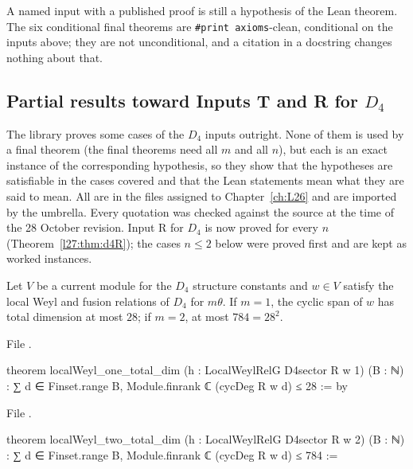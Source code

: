 \begin{warning}[title={Source citations do not discharge hypotheses}]
A named input with a published proof is still a hypothesis of the Lean theorem. The six conditional final theorems are
\texttt{\#print axioms}-clean, conditional on the inputs above; they are not unconditional, and a citation in a docstring changes
nothing about that.
\end{warning}

\subsection{Partial results toward Inputs T and R for \texorpdfstring{$D_4$}{D4}}\label{l27:sec:partial}

The library proves some cases of the $D_4$ inputs outright. None of them is used by a final theorem (the final theorems need all
$m$ and all $n$), but each is an exact instance of the corresponding hypothesis, so they show that the hypotheses are satisfiable in
the cases covered and that the Lean statements mean what they are said to mean. All are in the files assigned to
Chapter~\ref{ch:L26} and are imported by the  umbrella. Every quotation was checked against the source at
the time of the 28 October revision. Input R for $D_4$ is now proved for every $n$ (Theorem~\ref{l27:thm:d4R}); the cases
$n\le2$ below were proved first and are kept as worked instances.

\begin{theorem}[Input T for $D_4$ at $m=1$ and $m=2$]\label{l27:thm:d4Tsmall}
Let $V$ be a current module for the $D_4$ structure constants and $w\in V$ satisfy the local Weyl and fusion relations of $D_4$ for
$m\theta$. If $m=1$, the cyclic span of $w$ has total dimension at most $28$; if $m=2$, at most $784=28^2$.
\end{theorem}
\noindent File .
\begin{leancode}
theorem localWeyl_one_total_dim (h : LocalWeylRelG D4sector R w 1) (B : ℕ) :
    ∑ d ∈ Finset.range B, Module.finrank ℂ (cycDeg R w d) ≤ 28 := by
\end{leancode}
\noindent File .
\begin{leancode}
theorem localWeyl_two_total_dim (h : LocalWeylRelG D4sector R w 2) (B : ℕ) :
    ∑ d ∈ Finset.range B, Module.finrank ℂ (cycDeg R w d) ≤ 784 :=
\end{leancode}

